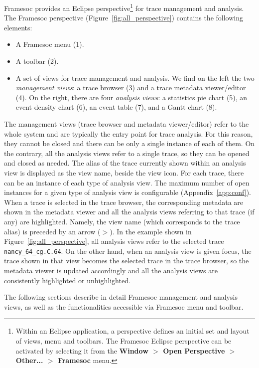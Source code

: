 \documentclass[twoside]{article}
\begin{document}
\begin{sloppypar}
Framesoc provides an Eclipse perspective\footnote{Within an Eclipse application, a perspective defines an initial set and layout of views, menu and toolbars. The Framesoc Eclipse perspective can be activated by selecting it from the \textbf{Window $>$ Open Perspective $>$ Other... $>$ Framesoc} menu.} for trace management and analysis.
The Framesoc perspective (Figure~\ref{fig:all_perspective}) contains the following elements:
\begin{itemize}
 \item A Framesoc menu (\num{1}).
 \item A toolbar (\num{2}).
 \item A set of views for trace management and analysis. We find on the left the two \emph{management views}: a trace browser (\num{3}) and a trace metadata viewer/editor (\num{4}). On the right, there are four \emph{analysis views}: a statistics pie chart (\num{5}), an event density chart (\num{6}), an event table (\num{7}), and a Gantt chart (\num{8}). 
\end{itemize}

The management views (trace browser and metadata viewer/editor) refer to the whole system and are typically the entry point for trace analysis.
For this reason, they cannot be closed and there can be only a single instance of each of them.
On the contrary, all the analysis views refer to a single trace, so they can be opened and closed as needed. 
The alias of the trace currently shown within an analysis view is displayed as the view name, beside the view icon.
For each trace, there can be an instance of each type of analysis view. 
The maximum number of open instances for a given type of analysis view is configurable (Appendix~\ref{app:conf}).
When a trace is selected in the trace browser, the corresponding metadata are shown in the metadata viewer and all the analysis views referring to that trace (if any) are highlighted. 
Namely, the view name (which corresponds to the trace alias) is preceded by an arrow (\emph{$>$}). 
In the example shown in Figure~\ref{fig:all_perspective}, all analysis views refer to the selected trace \texttt{nancy\_64\_cg.C.64}.
On the other hand, when an analysis view is given focus, the trace shown in that view becomes the selected trace in the trace browser, so the metadata viewer is updated accordingly and all the analysis views are consistently highlighted or unhighlighted. 

The following sections describe in detail Framesoc management and analysis views, as well as the functionalities accessible via Framesoc menu and toolbar.


\end{sloppypar}
\end{document}
